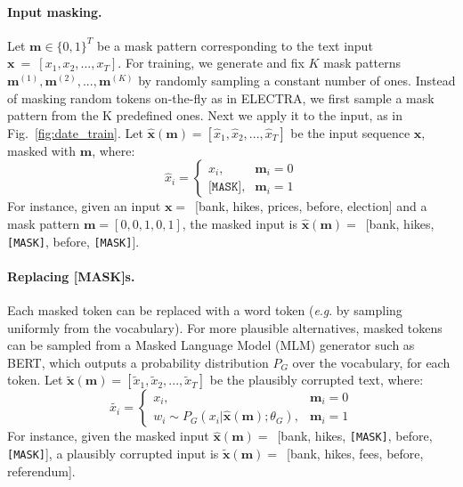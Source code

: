 \documentclass[11pt]{article}
\newcommand{\bx}{\bm{x}}
\newcommand{\eg}{\textit{e}.\textit{g}. }
\begin{document}
\paragraph{Input masking.} Let $\bm{m} \in \{0,1\}^T$ be a mask pattern corresponding to the text input $\bx~=~[x_1, x_2, ..., x_T]$. For training, we generate and fix $K$ mask patterns $\bm{m}^{(1)}, \bm{m}^{(2)}, ..., \bm{m}^{(K)}$ by randomly sampling a constant number of ones. Instead of masking random tokens on-the-fly as in ELECTRA, we first sample a mask pattern from the K predefined ones. Next we apply it to the input, as in Fig.~\ref{fig:date_train}.
Let $\bm{\hat{x}}(\bm{m})=[\hat{x}_1, \hat{x}_2, ..., \hat{x}_T]$ be the input sequence $\bx$, masked with $\bm{m}$, where:
\begin{equation*}
    \hat{x}_i=
    \begin{cases}
      x_i, & \bm{m}_i=0 \\
      \texttt{[MASK]}, & \bm{m}_i=1
    \end{cases}
\end{equation*}
For instance, given an input $\bx=$~[bank, hikes, prices, before, election] and a mask pattern $\bm{m} = [0, 0, 1, 0, 1]$, the masked input is $\bm{\hat{x}}(\bm{m})=$~[bank, hikes, \texttt{[MASK]}, before, \texttt{[MASK]}].


\paragraph{Replacing [MASK]s.} Each masked token can be replaced with a word token (\eg by sampling uniformly from the vocabulary). For more plausible alternatives, masked tokens can be sampled from a Masked Language Model (MLM) generator such as BERT, which outputs a probability distribution $P_G$ over the vocabulary, for each token. Let $\widetilde{\bx}(\bm{m})=[\widetilde{x}_1, \widetilde{x}_2, ..., \widetilde{x}_T]$ be the plausibly corrupted text, where:
\begin{equation*}
    \widetilde{x_i}=
    \begin{cases}
      x_i, & \bm{m}_i=0 \\
      w_i\sim P_{G}(x_i|\bm{\hat{x}}(\bm{m});\theta_G), & \bm{m}_i=1
    \end{cases}
\end{equation*}
For instance, given the masked input $\bm{\hat{x}}(\bm{m})=$~[bank, hikes, \texttt{[MASK]}, before, \texttt{[MASK]}], a plausibly corrupted input is $\widetilde{\bx}(\bm{m})=$~[bank, hikes, fees, before, referendum].
\end{document}

